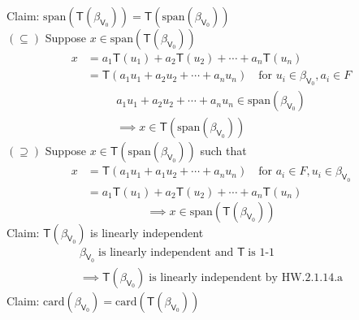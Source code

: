 \begin{enumerate}[(a)]
Claim: $\text{span}(\mathsf{T}(\beta_{\mathsf{V}_0})) = \mathsf{T}(\text{span}(\beta_{\mathsf{V}_0}))$
\\$(\subseteq)$ Suppose $x \in
\text{span}(\mathsf{T}(\beta_{\mathsf{V}_0}))$
\begin{align}
x &= a_1\mathsf{T}(u_1) + a_2\mathsf{T}(u_2) + \dotsb +
a_n\mathsf{T}(u_n)\\
&= \mathsf{T}(a_1u_1 +a_2u_2 + \dotsb + a_nu_n)\quad \text{for } u_i
\in \beta_{\mathsf{V}_0}, a_i \in F
\end{align}
\begin{gather}
a_1u_1 +a_2u_2 +\dotsb + a_nu_n \in
\text{span}(\beta_{\mathsf{V}_0})\\
\implies x \in \mathsf{T}(\text{span}(\beta_{\mathsf{V}_0}))
\end{gather}
$(\supseteq)$ Suppose $x\in
\mathsf{T}(\text{span}(\beta_{\mathsf{V}_0}))$ such that 
\begin{align}
x &= \mathsf{T}(a_1u_1 + a_1u_2 +\dotsb +
a_nu_n)\quad\text{for }a_i \in F, u_i \in
\beta_{\mathsf{V}_0}\\
&= a_1\mathsf{T}(u_1) + a_2\mathsf{T}(u_2) + \dotsb + a_n\mathsf{T}(u_n)
\end{align}
\begin{equation}
\implies x \in \text{span}(\mathsf{T}(\beta_{\mathsf{V}_0}))
\end{equation}
Claim: $\mathsf{T}(\beta_{\mathsf{V}_0})$ is linearly independent
\begin{gather}
\beta_{\mathsf{V}_0}\; \text{is linearly independent and } \mathsf{T}
\; \text{is 1-1}\\
\implies \mathsf{T}(\beta_{\mathsf{V}_0})\; \text{is linearly
  independent by HW.2.1.14.a} 
\end{gather}
\newpage{}
Claim: $\text{card}(\beta_{\mathsf{V}_0}) =
\text{card}(\mathsf{T}(\beta_{\mathsf{V}_0}))$

\end{enumerate}
